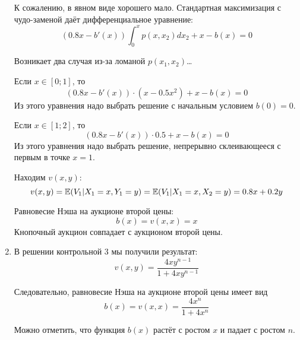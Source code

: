 \begin{enumerate}


К сожалению, в явном виде хорошего мало. Стандартная максимизация с чудо-заменой даёт дифференциальное уравнение:
\begin{equation}
(0.8x-b'(x))\int_{0}^{x}p(x,x_{2})dx_{2}+x-b(x)=0
\end{equation}

Возникает два случая из-за ломаной $ p(x_{1},x_{2}) $\ldots

Если $ x\in [0;1] $, то
\begin{equation}
(0.8x-b'(x))\cdot (x-0.5x^{2})+x-b(x)=0
\end{equation}
Из этого уравнения надо выбрать решение с начальным условием $ b(0)=0 $.

Если $ x\in [1;2] $, то
\begin{equation}
(0.8x-b'(x))\cdot 0.5+x-b(x)=0
\end{equation}
Из этого уравнения надо выбрать решение, непрерывно склеивающееся с первым в точке $x=1$.


Находим $ v(x,y) $:
\begin{equation}
v(x,y)=\operatorname{\mathbb{E}}(V_{1}|X_{1}=x,Y_{1}=y)=\operatorname{\mathbb{E}}(V_{1}|X_{1}=x,X_{2}=y)=0.8x+0.2y
\end{equation}

Равновесие Нэша на аукционе второй цены:
\begin{equation}
b(x)=v(x,x)=x
\end{equation}
Кнопочный аукцион совпадает с аукционом второй цены.


\item В решении контрольной 3 мы получили результат:
\begin{equation}
v(x,y)=\frac{4xy^{n-1}}{1+4xy^{n-1}}
\end{equation}

Следовательно, равновесие Нэша на аукционе второй цены имеет вид
\begin{equation}
b(x)=v(x,x)=\frac{4x^{n}}{1+4x^{n}}
\end{equation}

Можно отметить, что функция $b(x)$ растёт с ростом $ x $ и падает с ростом $ n $.


\end{enumerate}
